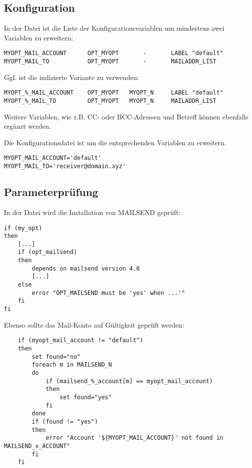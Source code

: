\subsection{Konfiguration}
    In der Datei  ist die Liste der Konfigurationsvariablen 
    um mindestens zwei Variablen zu erweitern:
\begin{verbatim}
MYOPT_MAIL_ACCOUNT      OPT_MYOPT       -       LABEL "default"
MYOPT_MAIL_TO           OPT_MYOPT       -       MAILADDR_LIST 
\end{verbatim}

    Ggf. ist die indizierte Variante zu verwenden:
\begin{verbatim}
MYOPT_%_MAIL_ACCOUNT    OPT_MYOPT   MYOPT_N     LABEL "default"
MYOPT_%_MAIL_TO         OPT_MYOPT   MYOPT_N     MAILADDR_LIST 
\end{verbatim}
    
    Weitere Variablen, wie z.B. CC- oder BCC-Adressen und Betreff können
    ebenfalls ergänzt werden.
     
    Die Konfigurationsdatei  ist um die entsprechenden
    Variablen zu erweitern.
    
\begin{verbatim}
MYOPT_MAIL_ACCOUNT='default'
MYOPT_MAIL_TO='receiver@domain.xyz' 
\end{verbatim}
     
\subsection{Parameterprüfung}
    In der Datei  wird die Installation von MAILSEND geprüft:
  
\begin{verbatim}
if (my_opt)
then
    [...]
    if (opt_mailsend)
    then
        depends on mailsend version 4.0
        [...]
    else
        error "OPT_MAILSEND must be 'yes' when ...'"
    fi
fi
\end{verbatim}

    Ebenso sollte das Mail-Konto auf Gültigkeit geprüft werden:
\begin{verbatim}
    if (myopt_mail_account != "default")
    then
        set found="no"
        foreach m in MAILSEND_N
        do
            if (mailsend_%_account[m] == myopt_mail_account)
            then
                set found="yes" 
            fi
        done
        if (found != "yes")
        then
            error "Account '${MYOPT_MAIL_ACCOUNT}' not found in MAILSEND_x_ACCOUNT"
        fi
    fi
\end{verbatim}

